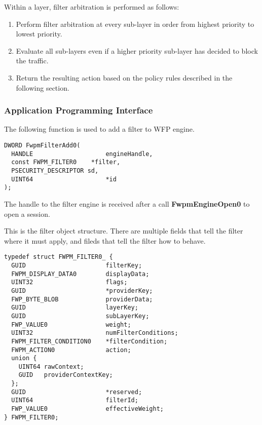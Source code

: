 \vspace{5mm}
Within a layer, filter arbitration is performed as follows:
\vspace{5mm}

\begin{enumerate}
\item Perform filter arbitration at every sub-layer in order from highest priority to lowest priority.
\item Evaluate all sub-layers even if a higher priority sub-layer has decided to block the traffic.
\item Return the resulting action based on the policy rules described in the following section.
\end{enumerate}

\vspace{5mm}

\subsubsection{Application Programming Interface}

\vspace{5mm}

The following function is used to add a filter to WFP engine.
\vspace{5mm}
\begin{lstlisting}
DWORD FwpmFilterAdd0(
  HANDLE               		engineHandle,
  const FWPM_FILTER0   	*filter,
  PSECURITY_DESCRIPTOR sd,
  UINT64               		*id
);
\end{lstlisting}
\vspace{5mm}

The handle to the filter engine is received after a call \textbf{FwpmEngineOpen0} to open a session.

\vspace{5mm}

This is the filter object structure. There are multiple fields that tell the filter where it must apply, and fileds that tell the filter how to behave.

\vspace{5mm}
\begin{lstlisting}
typedef struct FWPM_FILTER0_ {
  GUID                   	filterKey;
  FWPM_DISPLAY_DATA0     	displayData;
  UINT32                 	flags;
  GUID                   	*providerKey;
  FWP_BYTE_BLOB          	providerData;
  GUID                   	layerKey;
  GUID                   	subLayerKey;
  FWP_VALUE0                weight;
  UINT32                 	numFilterConditions;
  FWPM_FILTER_CONDITION0 	*filterCondition;
  FWPM_ACTION0              action;
  union {
    UINT64 rawContext;
    GUID   providerContextKey;
  };
  GUID                   	*reserved;
  UINT64                 	filterId;
  FWP_VALUE0             	effectiveWeight;
} FWPM_FILTER0;
\end{lstlisting}
\vspace{5mm}

